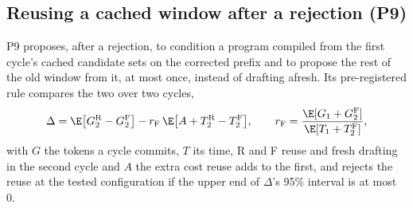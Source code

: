\subsection{Reusing a cached window after a rejection (P9)}\label{app:p9}
P9 proposes, after a rejection, to condition a program compiled from the first cycle's cached candidate sets on the corrected prefix and to propose the rest of the old window from it, at most once, instead of drafting afresh. Its pre-registered rule compares the two over two cycles,
\begin{equation}\label{eq:p9}
\Delta=\E\bigl[G_2^{\rm R}-G_2^{\rm F}\bigr]-r_{\rm F}\,\E\bigl[A+T_2^{\rm R}-T_2^{\rm F}\bigr],\qquad r_{\rm F}=\frac{\E[G_1+G_2^{\rm F}]}{\E[T_1+T_2^{\rm F}]},
\end{equation}
with $G$ the tokens a cycle commits, $T$ its time, R and F reuse and fresh drafting in the second cycle and $A$ the extra cost reuse adds to the first, and rejects the reuse at the tested configuration if the upper end of $\Delta$'s 95\% interval is at most 0.

